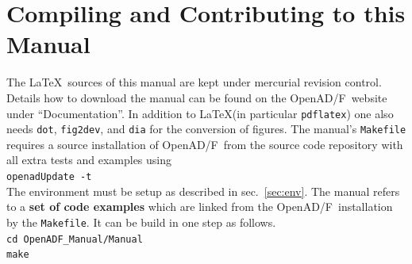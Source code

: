 \documentclass{book}
\newcommand{\OpenADF}{OpenAD/F}
\newcommand{\refsec}[1]{{sec.~\ref{#1}}}
\begin{document}
\section{Compiling and Contributing to this Manual}\label{sec:compilingManual}
The \LaTeX\ sources of this manual are kept under 
mercurial revision control. Details how to download 
the manual can be found on the \OpenADF\ website under ``Documentation''.  
In addition to \LaTeX  (in particular \lstinline{pdflatex}) 
one also needs \lstinline{dot}, \lstinline{fig2dev}, and 
\lstinline{dia} for the conversion of figures. 
The manual's \lstinline{Makefile} requires a source installation of \OpenADF\
from the source code repository with all extra tests and examples using \\[1ex]
\hspace*{.3cm}\lstinline{openadUpdate -t}\\[1ex]
The environment must be setup as described in \refsec{sec:env}.
The manual refers to a {\bf set of code examples} which are 
linked from the \OpenADF\ installation by the \lstinline{Makefile}.
It can be build in one step as follows.\\[1ex]
\hspace*{.3cm}\lstinline{cd OpenADF_Manual/Manual}\\
\hspace*{.3cm}\lstinline{make}\\[1ex]
   
\end{document}
